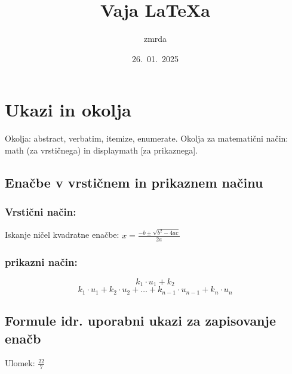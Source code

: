 \documentclass[a4paper]{article}
\begin{document}

\title{Vaja \LaTeX a}
\author{zmrda}
\date{26.\ 01.\ 2025}
\maketitle 



\section{Ukazi in okolja}

Okolja: abstract, verbatim, itemize, enumerate. 
Okolja za matematični način: math (za vrstičnega) in displaymath 
[za prikaznega]. 


\subsection{Enačbe v vrstičnem in prikaznem načinu}
\subsubsection{Vrstični način:}
Iskanje ničel kvadratne enačbe: \(x = \frac{-b \pm \sqrt{b^2 - 4ac}}{2a}\)


\subsubsection{prikazni način:}
\begin{center}
   \[k_1\cdot u_1+k_2\]
   \[k_1 \cdot u_1 + k_2 \cdot u_2 + \ldots + k_{n-1} \cdot u_{n-1} + k_n \cdot u_n\]

\end{center}%



\subsection{Formule idr. uporabni ukazi za zapisovanje enačb}
\begin{raggedright}
Ulomek: 
$\frac{22}{7}$ \\
\end{raggedright}
\end{document}
